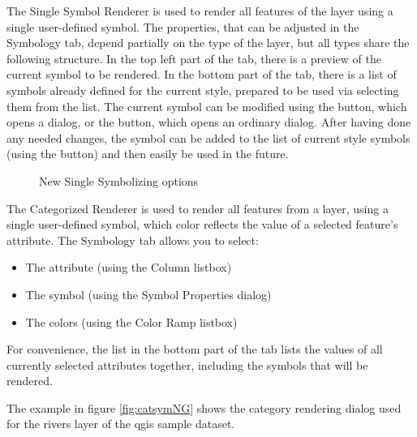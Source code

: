 The Single Symbol Renderer is used to render all features of the layer using a 
single user-defined symbol. The properties, that can be adjusted in the 
Symbology tab, depend partially on the type of the layer, but all types share 
the following structure. In the top left part of the tab, there is a preview of 
the current symbol to be rendered. In the bottom part of the tab, there is a 
list of symbols already defined for the current style, prepared to be used via 
selecting them from the list. The current symbol can be modified using the 
 button, which opens a  dialog, or 
the  button, which opens an ordinary  dialog.
After having done any needed changes, the symbol can be added to the list of 
current style symbols (using the  button) and then easily 
be used in the future.
 
\begin{figure}[h]
\centering
\caption{New Single Symbolizing options \nixcaption}
   \goodgap
   \goodgap
\end{figure}


The Categorized Renderer is used to render all features from a layer, using a 
single user-defined symbol, which color reflects the value of a selected 
feature's attribute. The Symbology tab allows you to select:

\begin{itemize}
\item The attribute (using the Column listbox)
\item The symbol (using the Symbol Properties dialog)
\item The colors (using the Color Ramp listbox)  
\end{itemize}

For convenience, the list in the bottom part of the tab lists the values of 
all currently selected attributes together, including the symbols that will 
be rendered.

The example in figure \ref{fig:catsymNG} shows the category rendering dialog 
used for the rivers layer of the qgis sample dataset.


